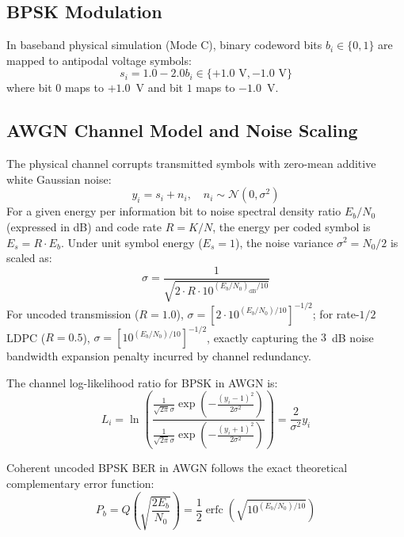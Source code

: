 \documentclass[conference]{IEEEtran}
\begin{document}
\subsection{BPSK Modulation}
In baseband physical simulation (Mode C), binary codeword bits $b_i \in \{0, 1\}$ are mapped to antipodal voltage symbols:
\begin{equation}
s_i = 1.0 - 2.0 b_i \in \{+1.0\text{ V}, -1.0\text{ V}\}
\end{equation}
where bit $0$ maps to $+1.0$~V and bit $1$ maps to $-1.0$~V.

\subsection{AWGN Channel Model and Noise Scaling}
The physical channel corrupts transmitted symbols with zero-mean additive white Gaussian noise:
\begin{equation}
y_i = s_i + n_i, \quad n_i \sim \mathcal{N}(0, \sigma^2)
\end{equation}
For a given energy per information bit to noise spectral density ratio $E_b/N_0$ (expressed in dB) and code rate $R = K/N$, the energy per coded symbol is $E_s = R \cdot E_b$. Under unit symbol energy ($E_s = 1$), the noise variance $\sigma^2 = N_0 / 2$ is scaled as:
\begin{equation}
\sigma = \frac{1}{\sqrt{2 \cdot R \cdot 10^{(E_b/N_0)_{\text{dB}}/10}}}
\end{equation}
For uncoded transmission ($R = 1.0$), $\sigma = [2 \cdot 10^{(E_b/N_0)/10}]^{-1/2}$; for rate-$1/2$ LDPC ($R = 0.5$), $\sigma = [10^{(E_b/N_0)/10}]^{-1/2}$, exactly capturing the $3$~dB noise bandwidth expansion penalty incurred by channel redundancy.

The channel log-likelihood ratio for BPSK in AWGN is:
\begin{equation}
L_i = \ln \left( \frac{\frac{1}{\sqrt{2\pi}\sigma} \exp \left( -\frac{(y_i - 1)^2}{2\sigma^2} \right)}{\frac{1}{\sqrt{2\pi}\sigma} \exp \left( -\frac{(y_i + 1)^2}{2\sigma^2} \right)} \right) = \frac{2}{\sigma^2} y_i
\end{equation}

Coherent uncoded BPSK BER in AWGN follows the exact theoretical complementary error function:
\begin{equation}
P_b = Q\left(\sqrt{\frac{2E_b}{N_0}}\right) = \frac{1}{2} \operatorname{erfc}\left(\sqrt{10^{(E_b/N_0)/10}}\right)
\end{equation}
\end{document}
